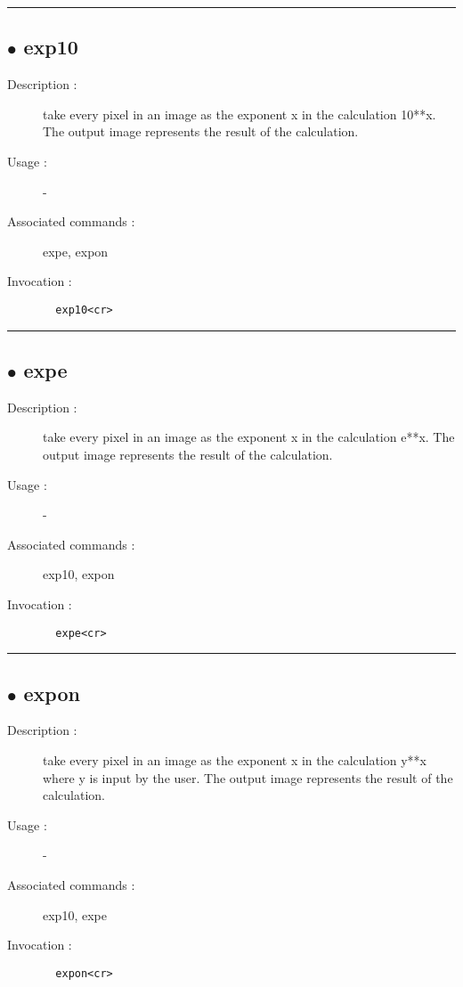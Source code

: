 \hrule \subsection*{$\bullet$ exp10}
\begin{description}
\item[Description :] take every pixel in an image as the exponent x in the calculation
10**x.  The output image represents the result of the calculation.
\item[Usage :] -
\item[Associated commands :] expe, expon
\item[Invocation :]

\verb+  exp10<cr> +\end{description}

\hrule \subsection*{$\bullet$ expe}
\begin{description}
\item[Description :] take every pixel in an image as the exponent x in the calculation
e**x.  The output image represents the result of the calculation.
\item[Usage :] -
\item[Associated commands :] exp10, expon
\item[Invocation :]

\verb+  expe<cr> +\end{description}

\hrule \subsection*{$\bullet$ expon}
\begin{description}
\item[Description :] take every pixel in an image as the exponent x in the calculation
y**x where y is input by the user. The output image represents the result
of the calculation.
\item[Usage :] -
\item[Associated commands :] exp10, expe
\item[Invocation :]

\verb+  expon<cr> +\end{description}

